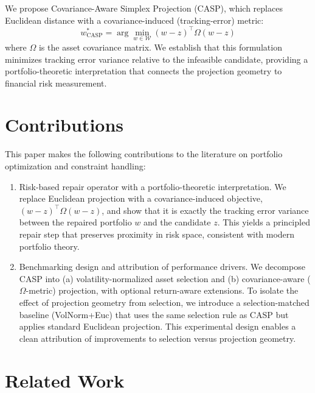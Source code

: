 \documentclass[10pt,twocolumn,a4paper]{article}
\begin{document}
We propose Covariance-Aware Simplex Projection (CASP), which replaces Euclidean distance with a covariance-induced (tracking-error) metric:
\begin{equation}
w^*_{\text{CASP}} = \arg\min_{w \in \mathcal{W}} (w - z)^\top \Omega (w - z)
\label{eq:casp}
\end{equation}
where $\Omega$ is the asset covariance matrix. We establish that this formulation minimizes tracking error variance relative to the infeasible candidate, providing a portfolio-theoretic interpretation that connects the projection geometry to financial risk measurement.

\section{Contributions}
\label{sec:contributions}

This paper makes the following contributions to the literature on portfolio optimization and constraint handling:

\begin{enumerate}
    \item Risk-based repair operator with a portfolio-theoretic interpretation. We replace Euclidean projection with a covariance-induced objective, $(w-z)^\top \Omega (w-z)$, and show that it is exactly the tracking error variance between the repaired portfolio $w$ and the candidate $z$. This yields a principled repair step that preserves proximity in risk space, consistent with modern portfolio theory.
    
    \item Benchmarking design and attribution of performance drivers. We decompose CASP into (a) volatility-normalized asset selection and (b) covariance-aware ($\Omega$-metric) projection, with optional return-aware extensions. To isolate the effect of projection geometry from selection, we introduce a selection-matched baseline (VolNorm+Euc) that uses the same selection rule as CASP but applies standard Euclidean projection. This experimental design enables a clean attribution of improvements to selection versus projection geometry.
\end{enumerate}

\section{Related Work}
\label{sec:literature}
\end{document}
